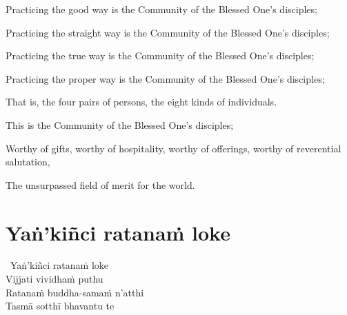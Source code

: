 \begin{english-verses}
  \begin{english-hang-firstline}
    Practicing the good way is the Community of the Blessed One's disciples;
  \end{english-hang-firstline}
  \begin{english-hangtogether-verses}
    Practicing the straight way is the Community of the Blessed One's disciples;
  \end{english-hangtogether-verses}
  \begin{english-hangtogether-verses}
    Practicing the true way is the Community of the Blessed One's disciples;
  \end{english-hangtogether-verses}
  \begin{english-hangtogether-verses}
    Practicing the proper way is the Community of the Blessed One's disciples;
  \end{english-hangtogether-verses}
  \begin{english-hangtogether-verses}
    That is, the four pairs of persons, the eight kinds of individuals.
  \end{english-hangtogether-verses}
  \begin{english-hangtogether-verses}
    This is the Community of the Blessed One's disciples;
  \end{english-hangtogether-verses}
  \begin{english-hangtogether-verses}
    Worthy of gifts, worthy of hospitality, worthy of offerings, worthy of reverential salutation,
  \end{english-hangtogether-verses}
  \begin{english-hangtogether-verses}
    The unsurpassed field of merit for the world.
  \end{english-hangtogether-verses}
\end{english-verses}

\suttaRef{[SN 11.3]}



\section{Yaṅ'kiñci ratanaṁ loke}
\label{yan-kinci-ratanam'loke}

\begin{pali-hangtogether}
  \anglebracketleft\ \hspace{-0.5mm}Yaṅ'kiñci ratanaṁ loke \hspace{-0.5mm}\anglebracketright\ \\
  Vijjati vividhaṁ puthu\\
  Ratanaṁ buddha-samaṁ n'atthi\\
  Tasmā sotthī bhavantu te
\end{pali-hangtogether}

